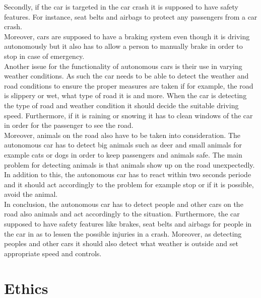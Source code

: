 \noindent  Secondly, if the car is targeted in the car crash it is supposed to have safety features. For instance, seat belts and airbags to protect any passengers from a car crash.\\
Moreover, cars are supposed to have a braking system even though it is driving autonomously but it also has to allow a person to manually brake in order to stop in case of emergency. \\

\noindent  Another issue for the functionality of autonomous cars is their use in varying weather conditions. As such the car needs to be able  to detect the weather and road conditions to ensure the proper measures are taken if for example, the road is slippery or wet, what type of road it is and more. When the car is detecting the type of road and weather condition it should decide the suitable driving speed. Furthermore, if it is raining or snowing it has to clean windows of the car in order for the passenger to see the road. \\

\noindent  Moreover, animals on the road also have to be taken into consideration. The autonomous car has to detect big animals such as deer and small animals for example cats or dogs in order to keep passengers and animals safe. The main problem for detecting animals is that animals show up on the road unexpectedly. In addition to this, the autonomous car has to react within two seconds periode and it should act accordingly to the problem for example stop or if it is possible, avoid the animal. \\

In conclusion, the autonomous car has to detect people and other cars on the road also animals and act accordingly to the situation. Furthermore, the car supposed to have safety features like brakes, seat belts and airbags for people in the car in as to lessen the possible injuries in a crash. Moreover, as detecting peoples and other cars it should also detect what weather is outside and set appropriate speed and controls. 





\section{Ethics}\label{Ethics}

